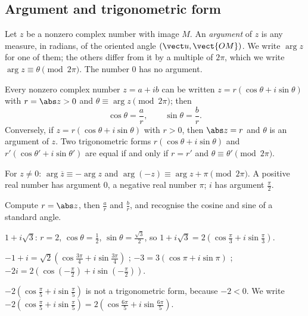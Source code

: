 \subsection{Argument and trigonometric form}
\begin{definition}[Argument]
Let $z$ be a nonzero complex number with image $M$. An \emph{argument} of $z$ is any measure, in radians, of the oriented angle $\left(\vect u,\vect{OM}\right)$. We write $\arg z$ for one of them; the others differ from it by a multiple of $2\pi$, which we write $\arg z\equiv\theta\pmod{2\pi}$. The number $0$ has no argument.
\end{definition}
\begin{theorem}
Every nonzero complex number $z=a+ib$ can be written $z=r(\cos\theta+i\sin\theta)$ with $r=\abs z>0$ and $\theta\equiv\arg z\pmod{2\pi}$; then
\[\cos\theta=\frac ar,\qquad\sin\theta=\frac br.\]
Conversely, if $z=r(\cos\theta+i\sin\theta)$ with $r>0$, then $\abs z=r$ and $\theta$ is an argument of $z$. Two trigonometric forms $r(\cos\theta+i\sin\theta)$ and $r'(\cos\theta'+i\sin\theta')$ are equal if and only if $r=r'$ and $\theta\equiv\theta'\pmod{2\pi}$.
\end{theorem}
\begin{theorem}
For $z\neq0$: $\arg\overline z\equiv-\arg z$ and $\arg(-z)\equiv\arg z+\pi\pmod{2\pi}$. A positive real number has argument $0$, a negative real number $\pi$; $i$ has argument $\frac\pi2$.
\end{theorem}
\begin{method}
Compute $r=\abs z$, then $\frac ar$ and $\frac br$, and recognise the cosine and sine of a standard angle.
\end{method}
\begin{example}
$1+i\sqrt3$: $r=2$, $\cos\theta=\frac12$, $\sin\theta=\frac{\sqrt3}2$, so $1+i\sqrt3=2\left(\cos\frac\pi3+i\sin\frac\pi3\right)$.\par
$-1+i=\sqrt2\left(\cos\frac{3\pi}4+i\sin\frac{3\pi}4\right)$ ; $-3=3(\cos\pi+i\sin\pi)$ ; $-2i=2\left(\cos\left(-\frac\pi2\right)+i\sin\left(-\frac\pi2\right)\right)$.
\end{example}
\begin{pitfall}
$-2\left(\cos\frac\pi5+i\sin\frac\pi5\right)$ is not a trigonometric form, because $-2<0$. We write $-2\left(\cos\frac\pi5+i\sin\frac\pi5\right)=2\left(\cos\frac{6\pi}5+i\sin\frac{6\pi}5\right)$.
\end{pitfall}
\begin{figurebox}[Modulus and argument of $z=a+ib$.]
\end{figurebox}
